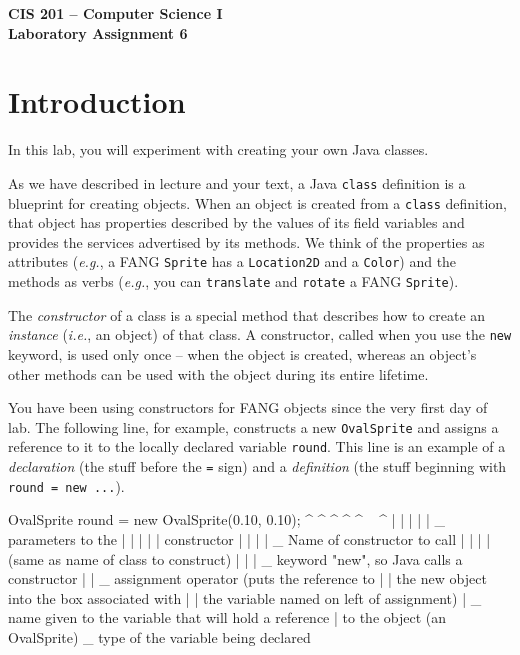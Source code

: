 \documentclass[12pt]{article}
\newenvironment{qv}%
  {\quote
   \verbatim}%
  {\endverbatim
   \endquote}
\newcommand{\code}{\texttt}
\begin{document}
\sloppypar

\begin{center}
\Large\bf
CIS 201 -- Computer Science I\\
Laboratory Assignment 6\\
\end{center}

\section*{Introduction}

In this lab, you will experiment with creating your own Java classes.

As we have described in lecture and your text, a Java \code{class}
definition is a blueprint for creating objects.  When an object is
created from a \code{class} definition, that object has properties
described by the values of its field variables and provides the
services advertised by its methods.  We think of the properties as
attributes ({\em e.g.}, a FANG \code{Sprite} has a \code{Location2D} and a
\code{Color}) and the methods as verbs
({\em e.g.}, you can \code{translate} and \code{rotate} a FANG \code{Sprite}).


The {\em constructor} of a class is a special method that describes
how to create an {\em instance} ({\em i.e.}, an object) of that class.  A
constructor, called when you use the \code{new} keyword, is used only
once -- when the object is created, whereas an object's other methods
can be used with the object during its entire lifetime.

You have been using constructors for FANG objects since the very first
day of lab. The following line, for example, constructs a new
\code{OvalSprite} and assigns a reference to it to the locally
declared variable \code{round}.
This line is an example of a {\em declaration}
(the stuff before the \verb'=' sign)
and a {\em definition}
(the stuff beginning with \verb'round = new ...').

\begin{qv}
OvalSprite round = new OvalSprite(0.10, 0.10);
^          ^     ^ ^   ^          ^^^^^^^^^^
|          |     | |   |                   \_ parameters to the
|          |     | |   |                      constructor
|          |     | |   \_ Name of constructor to call
|          |     | |      (same as name of class to construct)
|          |     | \_ keyword "new", so Java calls a constructor
|          |     \_ assignment operator (puts the reference to 
|          |         the new object into the box associated with 
|          |         the variable named on left of assignment)
|          \_ name given to the variable that will hold a reference
|             to the object (an OvalSprite)
\_ type of the variable being declared
\end{qv}
\end{document}
